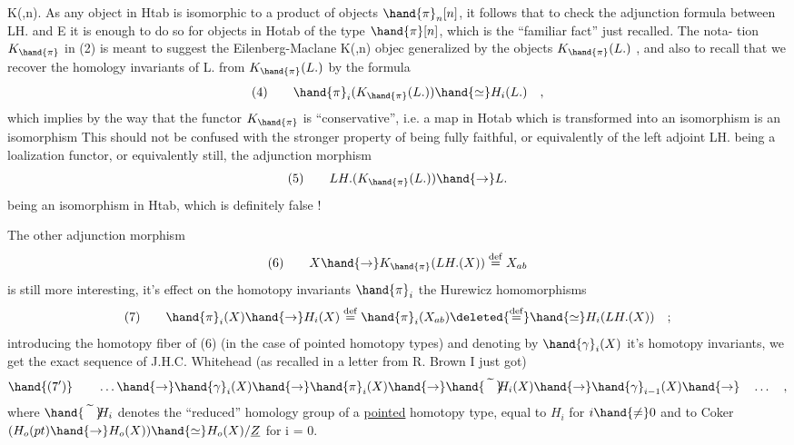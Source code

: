 K(\hand{$\pi$},n). As any object in Htab  is isomorphic to a
product of objects $\hand{\pi}_n[n]$, it follows that   to check the adjunction
formula between LH. and E it is enough to do so for objects in Hotab
of the type $\hand{\pi}[n]$, which is the ``familiar fact'' just recalled. The nota-%
tion $K_{\hand{\pi}}$ in (2) is meant to suggest the Eilenberg-Maclane K(\hand{$\pi$},n) objec
generalized by the objects $K_{\hand{\pi}}(L.)$ , and also to recall that we recover
the homology invariants of  L. from $K_{\hand{\pi}}(L.)$  by the formula
\[
(4) \qquad \hand{\pi}_i(K_{\hand{\pi}}(L.)) \hand{\simeq} H_i(L.) \quad ,
\]
which implies by the way that the functor $K_{\hand{\pi}}$ is ``conservative'', i.e.
a map in Hotab which is transformed into an isomorphism is an isomorphism
This should not be confused with the stronger property of being fully
faithful, or equivalently of the left adjoint LH. being a loalization
functor, or equivalently still, the adjunction morphism
\[
(5) \qquad LH.(K_{\hand{\pi}}(L.)) \hand{\to} L.
\]
being an isomorphism in Htab, which is definitely false !

The other adjunction morphism
\[
(6) \qquad X \hand{\to} K_{\hand{\pi}}(LH.(X)) \overset{\mathrm{def}}{=} X_{ab}
\]
is still more interesting, it's effect on the homotopy invariants $\hand{\pi}_i$ 
the Hurewicz  homomor\-phisms
\[
(7) \qquad \hand{\pi}_i(X) \hand{\to} H_i(X) \overset{\mathrm{def}}{=} \hand{\pi}_i(X_{ab}) \deleted{\overset{\mathrm{def}}{=}}\hand{\simeq} H_i(LH.(X)) \quad ;
\]
 introducing the homotopy fiber of (6) (in the case of pointed
homotopy types) and denoting by $\hand{\gamma}_i(X)$ it's homotopy invariants, we get
the exact sequence of J.H.C. Whitehead (as recalled in a letter from R.
Brown I just got)
\[
\hand{(7')} \qquad \dots \hand{\to} \hand{\gamma}_i(X) \hand{\to} \hand{\pi}_i(X) \hand{\to} \hand{\widetilde{\phantom{H}}}\!\!H_i(X) \hand{\to} \hand{\gamma}_{i-1}(X) \hand{\to} \quad \dots \quad ,
\]
where $\hand{\widetilde{\phantom{H}}}\!\!H_i$ denotes the ``reduced'' homology group of a \uline{pointed} homotopy
type, equal to $H_i$ for $i\hand{\neq}0$ and to Coker $(H_o(pt) \hand{\to} H_o(X)) \hand{\simeq} H_o(X)/\underline{Z}$ for
i = 0.

